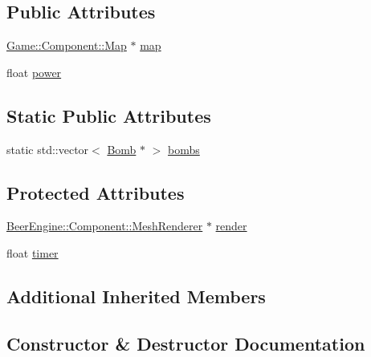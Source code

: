 \subsection*{Public Attributes}
\begin{DoxyCompactItemize}
\item 
\mbox{\hyperlink{class_game_1_1_component_1_1_map}{Game\+::\+Component\+::\+Map}} $\ast$ \mbox{\hyperlink{class_game_1_1_component_1_1_bomb_af6be11b39be1333d5bbd64b059bc2b33}{map}}
\item 
float \mbox{\hyperlink{class_game_1_1_component_1_1_bomb_a0e4068ea1fe8146c412c76f472db7087}{power}}
\end{DoxyCompactItemize}
\subsection*{Static Public Attributes}
\begin{DoxyCompactItemize}
\item 
static std\+::vector$<$ \mbox{\hyperlink{class_game_1_1_component_1_1_bomb}{Bomb}} $\ast$ $>$ \mbox{\hyperlink{class_game_1_1_component_1_1_bomb_a9dc5871647b57df886487e2d936b4dcc}{bombs}}
\end{DoxyCompactItemize}
\subsection*{Protected Attributes}
\begin{DoxyCompactItemize}
\item 
\mbox{\hyperlink{class_beer_engine_1_1_component_1_1_mesh_renderer}{Beer\+Engine\+::\+Component\+::\+Mesh\+Renderer}} $\ast$ \mbox{\hyperlink{class_game_1_1_component_1_1_bomb_ae70ae4cc38793d675183efa64ac25f36}{render}}
\item 
float \mbox{\hyperlink{class_game_1_1_component_1_1_bomb_a4c1dc12e98181874a406edd83b98ffa1}{timer}}
\end{DoxyCompactItemize}
\subsection*{Additional Inherited Members}


\subsection{Constructor \& Destructor Documentation}
\mbox{\label{class_game_1_1_component_1_1_bomb_aed38ca47ddf849382948b02485be41f8}} 
